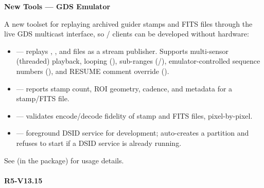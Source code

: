 \noindent\textbf{New Tools --- GDS Emulator}\par\nobreak
A new toolset for replaying archived guider stamps and FITS files through
the live GDS multicast interface, so / clients
can be developed without hardware:

\begin{itemize}\compactlist
  \item {} --- replays , , and  files as a
    stream publisher. Supports multi-sensor (threaded) playback, looping
    (), sub-ranges (/), emulator-controlled sequence numbers
    (), and RESUME comment override ().
  \item {} --- reports stamp count, ROI geometry, cadence, and
    metadata for a stamp/FITS file.
  \item {} --- validates encode/decode fidelity of stamp and
    FITS files, pixel-by-pixel.
  \item {} --- foreground DSID service for development; auto-creates
    a partition and refuses to start if a DSID service is already running.
\end{itemize}

See  (in the  package) for usage details.


\paragraph{R5-V13.15}

